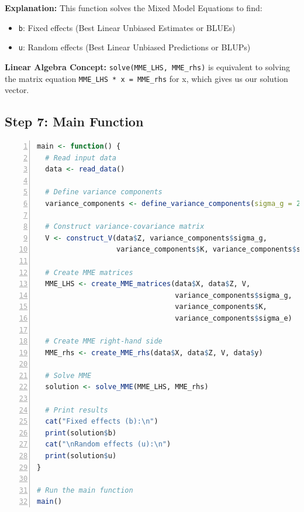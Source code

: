 \documentclass[12pt,a4paper]{article}
\begin{document}
\textbf{Explanation:}
This function solves the Mixed Model Equations to find:
\begin{itemize}
  \item \texttt{b}: Fixed effects (Best Linear Unbiased Estimates or BLUEs)
  \item \texttt{u}: Random effects (Best Linear Unbiased Predictions or BLUPs)
\end{itemize}

\textbf{Linear Algebra Concept:} \texttt{solve(MME\_LHS, MME\_rhs)} is equivalent to solving the matrix equation \texttt{MME\_LHS * x = MME\_rhs} for x, which gives us our solution vector.

\subsection{Step 7: Main Function}

\begin{lstlisting}[language=R, 
                   caption=Step 2: Defining Variance Components,
                   basicstyle=\ttfamily\footnotesize,
                   keywordstyle=\color{blue},
                   stringstyle=\color{red},
                   commentstyle=\color{green!60!black},
                   numbers=left,
                   numberstyle=\tiny\color{gray},
                   frame=single,
                   breaklines=true,
                   linewidth=0.95\textwidth,
                   columns=flexible,
                   xleftmargin=0.05\textwidth,
                   xrightmargin=0.05\textwidth]
main <- function() {
  # Read input data
  data <- read_data()
  
  # Define variance components
  variance_components <- define_variance_components(sigma_g = 2, sigma_e = 1)
  
  # Construct variance-covariance matrix
  V <- construct_V(data$Z, variance_components$sigma_g, 
                   variance_components$K, variance_components$sigma_e)
  
  # Create MME matrices
  MME_LHS <- create_MME_matrices(data$X, data$Z, V, 
                                 variance_components$sigma_g, 
                                 variance_components$K, 
                                 variance_components$sigma_e)
  
  # Create MME right-hand side
  MME_rhs <- create_MME_rhs(data$X, data$Z, V, data$y)
  
  # Solve MME
  solution <- solve_MME(MME_LHS, MME_rhs)
  
  # Print results
  cat("Fixed effects (b):\n")
  print(solution$b)
  cat("\nRandom effects (u):\n")
  print(solution$u)
}

# Run the main function
main()
\end{lstlisting}
\end{document}
